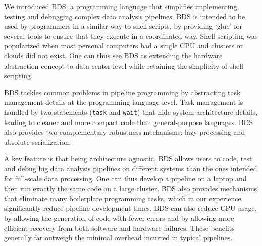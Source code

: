 We introduced BDS, a programming language that simplifies implementing, testing and debugging complex data analysis pipelines. BDS is intended to be used by programmers in a similar way to shell scripts, by providing ‘glue’ for several tools to ensure that they execute in a coordinated way. Shell scripting was popularized when most personal computers had a single CPU and clusters or clouds did not exist. One can thus see BDS as extending the hardware abstraction concept to data-center level while retaining the simplicity of shell scripting.

BDS tackles common problems in pipeline programming by abstracting task management details at the programming language level. Task management is handled by two statements (\texttt{task} and \texttt{wait}) that hide system architecture details, leading to cleaner and more compact code than general-purpose languages. BDS also provides two complementary robustness mechanisms: lazy processing and absolute serialization.

A key feature is that being architecture agnostic, BDS allows users to code, test and debug big data analysis pipelines on different systems than the ones intended for full-scale data processing. One can thus develop a pipeline on a laptop and then run exactly the same code on a large cluster. BDS also provides mechanisms that eliminate many boilerplate programming tasks, which in our experience significantly reduce pipeline development times. BDS can also reduce CPU usage, by allowing the generation of code with fewer errors and by allowing more efficient recovery from both software and hardware failures. These benefits generally far outweigh the minimal overhead incurred in typical pipelines.

